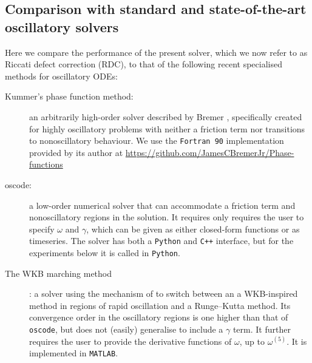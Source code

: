 \documentclass[10pt]{article}
\newcommand{\om}{\omega}
\newcommand{\g}{\gamma}
\begin{document}
\subsection{Comparison with standard and state-of-the-art oscillatory solvers \label{solvercomp}}

Here we compare the performance of the present solver, which
we now refer to as Riccati defect correction (RDC), to that of the
following recent specialised methods for oscillatory ODEs:
\begin{description}
\item[Kummer's phase function method:]{ an arbitrarily high-order solver
        described by Bremer \cite{bremer2018}, specifically created for highly
        oscillatory problems with neither a friction term nor
        transitions to nonoscillatory behaviour.
        We use the \texttt{Fortran 90} implementation provided by its author
        at
        \url{https://github.com/JamesCBremerJr/Phase-functions}
        }
\item[oscode:]   %
{a low-order numerical solver
        \cite{agocs2020efficient,agocs2020dense} that can accommodate a
        friction term and nonoscillatory regions in the solution. It requires
        only requires the user to specify $\om$ and $\g$, which can be given as
        either closed-form functions or as timeseries. The solver has both a
        \texttt{Python} and \texttt{C++} interface, but for the experiments below it is called in
        \texttt{Python}.}
\item[The WKB marching method] {\cite{arnold2011wkb,korner2022wkb}:
  a solver using
        the mechanism of \cite{agocs2020efficient} to switch between an a
        WKB-inspired method in regions of rapid oscillation and a Runge--Kutta
        method. Its convergence order in the oscillatory regions is one higher
        than that of \texttt{oscode}, but does not (easily) generalise to
        include a $\g$ term. It further requires the user to provide
        the derivative functions of $\om$, up to $\om^{(5)}$.
        It is implemented in \texttt{MATLAB}.
    }
\end{description}
\end{document}
